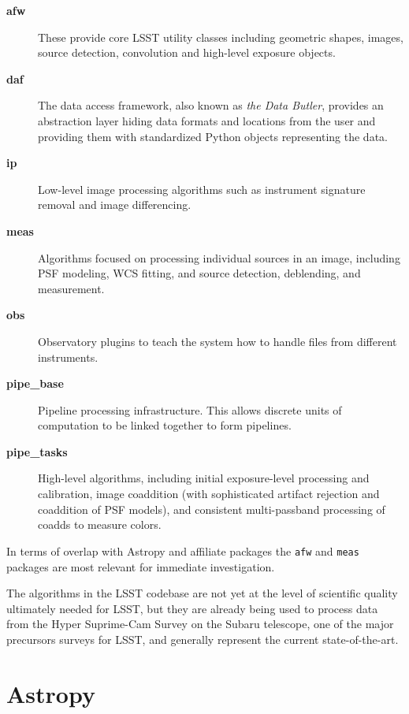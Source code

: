 \documentclass[]{spie}  %
\begin{document}
\begin{description}
\item[\textbf{afw}] These provide core LSST utility classes including geometric shapes, images, source detection, convolution and high-level exposure objects.

\item[\textbf{daf}] The data access framework, also known as \emph{the Data Butler}, provides an abstraction layer hiding data formats and locations from the user and providing them with standardized Python objects representing the data.

\item[\textbf{ip}] Low-level image processing algorithms such as instrument signature removal and image differencing.

\item[\textbf{meas}] Algorithms focused on processing individual sources in an image, including PSF modeling, WCS fitting, and source detection, deblending, and measurement.

\item[\textbf{obs}] Observatory plugins to teach the system how to handle files from different instruments.

\item[\textbf{pipe\_base}] Pipeline processing infrastructure. This allows discrete units of computation to be linked together to form pipelines.

\item[\textbf{pipe\_tasks}] High-level algorithms, including initial exposure-level processing and calibration, image coaddition (with sophisticated artifact rejection and coaddition of PSF models), and consistent multi-passband processing of coadds to measure colors.

\end{description}

In terms of overlap with Astropy and affiliate packages the \texttt{afw} and \texttt{meas} packages are most relevant for immediate investigation.

The algorithms in the LSST codebase are not yet at the level of scientific quality ultimately needed for LSST, but they are already being used to process data from the Hyper Suprime-Cam Survey on the Subaru telescope\cite{2012SPIE.8446E..0ZM}, one of the major precursors surveys for LSST, and generally represent the current state-of-the-art.


\section{Astropy}
\end{document}
